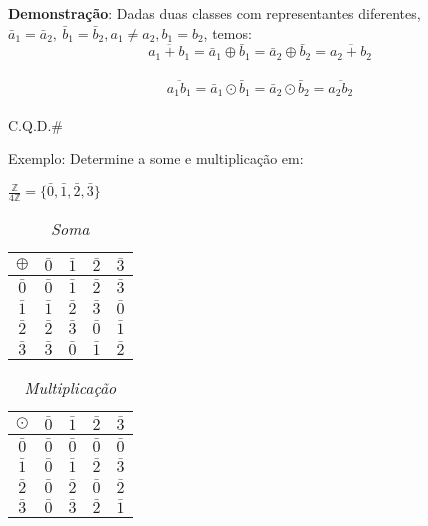 \textbf{Demonstra{\c c}{\~a}o}: Dadas duas classes com representantes diferentes, $\bar{a}_{1}=\bar{a}_{2},\  \bar{b}_{1}=\bar{b}_{2}, a_{1}\neq a_{2}, b_{1}=b_{2}$, temos:\\
\[\overline{a_{1}+b_{1}}=\bar{a}_{1}\oplus\bar{b}_{1}=\bar{a}_{2}\oplus\bar{b}_{2}=\overline{a_{2}+b_{2}}\]\\
\[\overline{a_{1}b_{1}}=\bar{a}_{1}\odot\bar{b}_{1}=\bar{a}_{2}\odot\bar{b}_{2}=\overline{a_{2}b_{2}}\]\\

C.Q.D.\#

Exemplo: Determine a some e multiplica{\c c}{\~a}o em:

$\displaystyle\frac{\mathbb{Z}}{4\mathbb{Z}}=\{\bar{0},\bar{1},\bar{2},\bar{3}\}$
\begin{table}[h]
   \centering 
   \setlength{\arrayrulewidth}{0,5\arrayrulewidth}
   \caption{\it Soma}
   \begin{tabular}{|c|c|c|c|c|} 
      \hline
      $\oplus$ & $\bar{0}$ & $\bar{1}$ & $\bar{2}$ & $\bar{3}$ \\
      \hline
      $\bar{0}$ & $\bar{0}$ & $\bar{1}$ & $\bar{2}$ & $\bar{3}$ \\
      \hline
      $\bar{1}$ & $\bar{1}$ & $\bar{2}$ & $\bar{3}$ & $\bar{0}$ \\
      \hline
      $\bar{2}$ & $\bar{2}$ & $\bar{3}$ & $\bar{0}$ & $\bar{1}$ \\
      \hline
      $\bar{3}$ & $\bar{3}$ & $\bar{0}$ & $\bar{1}$ & $\bar{2}$ \\
      \hline
   \end{tabular}
\end{table}

\begin{table}[h]
   \centering 
   \setlength{\arrayrulewidth}{0,5\arrayrulewidth}
   \caption{\it Multiplica{\c c}{\~a}o}
   \begin{tabular}{|c|c|c|c|c|} 
      \hline
      $\odot$ & $\bar{0}$ & $\bar{1}$ & $\bar{2}$ & $\bar{3}$ \\
      \hline
      $\bar{0}$ & $\bar{0}$ & $\bar{0}$ & $\bar{0}$ & $\bar{0}$ \\
      \hline
      $\bar{1}$ & $\bar{0}$ & $\bar{1}$ & $\bar{2}$ & $\bar{3}$ \\
      \hline
      $\bar{2}$ & $\bar{0}$ & $\bar{2}$ & $\bar{0}$ & $\bar{2}$ \\
      \hline
      $\bar{3}$ & $\bar{0}$ & $\bar{3}$ & $\bar{2}$ & $\bar{1}$ \\
      \hline
   \end{tabular}
\end{table}


